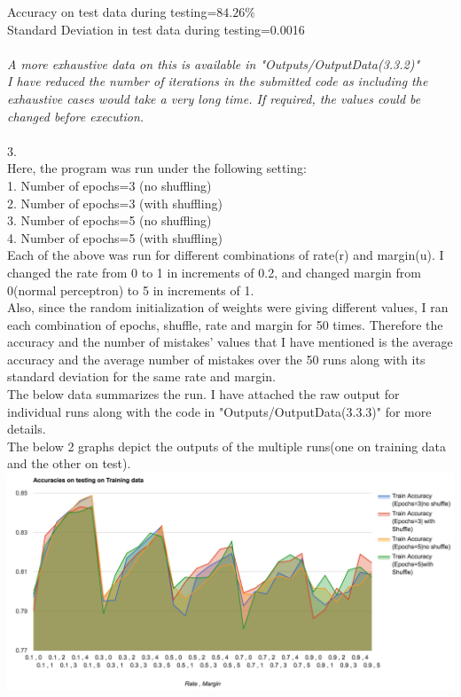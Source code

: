 \documentclass[12pt, fullpage,letterpaper]{article}
\begin{document}
Accuracy on test data during testing=$84.26\%$ \\
Standard Deviation in test data during testing=0.0016\\\\
\emph{A more exhaustive data on this is available in "Outputs/OutputData(3.3.2)"\\
I have reduced the number of iterations in the submitted code as including the exhaustive cases would take a very long time. If required, the values could be changed before execution.}\\\\
3.\\
Here, the program was run under the following setting:\\
1. Number of epochs=3 (no shuffling)\\
2. Number of epochs=3 (with shuffling)\\
3. Number of epochs=5 (no shuffling)\\
4. Number of epochs=5 (with shuffling)\\
Each of the above was run for different  combinations of rate(r) and margin(u). I changed the rate from 0 to 1 in increments of 0.2, and changed margin from 0(normal perceptron) to 5 in increments of 1.\\
Also, since the random initialization of weights were giving different values, I ran each combination of epochs, shuffle, rate and margin for 50 times. Therefore the accuracy and the number of mistakes' values that I have mentioned is the average accuracy and the average number of mistakes over the 50 runs along with its standard deviation for the same rate and margin.\\
The below data summarizes the run. I have attached the raw output for individual runs along with the code in "Outputs/OutputData(3.3.3)" for more details.\\
The below 2 graphs depict the outputs of the multiple runs(one on training data and the other on test).\\
\includegraphics[scale=0.45]{333Train.png}
\end{document}

